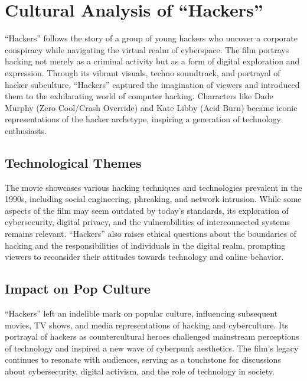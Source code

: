 \documentclass[
  openany]{book}
\begin{document}
\hypertarget{cultural-analysis-of-hackers}{%
\chapter{Cultural Analysis of ``Hackers''}\label{cultural-analysis-of-hackers}}

``Hackers'' follows the story of a group of young hackers who uncover a corporate conspiracy while navigating the virtual realm of cyberspace. The film portrays hacking not merely as a criminal activity but as a form of digital exploration and expression. Through its vibrant visuals, techno soundtrack, and portrayal of hacker subculture, ``Hackers'' captured the imagination of viewers and introduced them to the exhilarating world of computer hacking. Characters like Dade Murphy (Zero Cool/Crash Override) and Kate Libby (Acid Burn) became iconic representations of the hacker archetype, inspiring a generation of technology enthusiasts.

\hypertarget{technological-themes}{%
\section{Technological Themes}\label{technological-themes}}

The movie showcases various hacking techniques and technologies prevalent in the 1990s, including social engineering, phreaking, and network intrusion. While some aspects of the film may seem outdated by today's standards, its exploration of cybersecurity, digital privacy, and the vulnerabilities of interconnected systems remains relevant. ``Hackers'' also raises ethical questions about the boundaries of hacking and the responsibilities of individuals in the digital realm, prompting viewers to reconsider their attitudes towards technology and online behavior.

\hypertarget{impact-on-pop-culture}{%
\section{Impact on Pop Culture}\label{impact-on-pop-culture}}

``Hackers'' left an indelible mark on popular culture, influencing subsequent movies, TV shows, and media representations of hacking and cyberculture. Its portrayal of hackers as countercultural heroes challenged mainstream perceptions of technology and inspired a new wave of cyberpunk aesthetics. The film's legacy continues to resonate with audiences, serving as a touchstone for discussions about cybersecurity, digital activism, and the role of technology in society.
\end{document}
